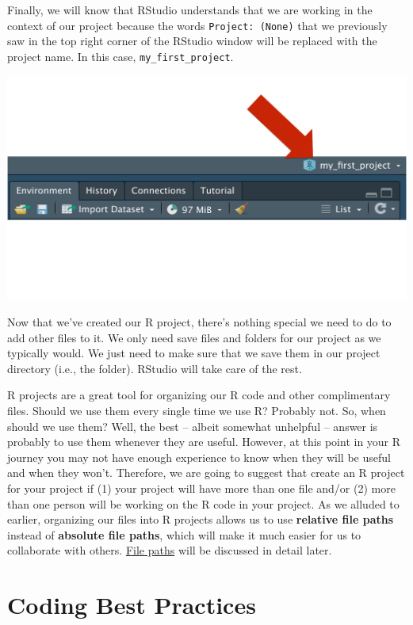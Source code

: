 \documentclass[
  letterpaper,
  DIV=11,
  numbers=noendperiod]{scrreprt}
\begin{document}
Finally, we will know that RStudio understands that we are working in
the context of our project because the words \texttt{Project:\ (None)}
that we previously saw in the top right corner of the RStudio window
will be replaced with the project name. In this case,
\texttt{my\_first\_project}.

\includegraphics{chapters/r_projects/check_rproj.png}

Now that we've created our R project, there's nothing special we need to
do to add other files to it. We only need save files and folders for our
project as we typically would. We just need to make sure that we save
them in our project directory (i.e., the folder). RStudio will take care
of the rest.

R projects are a great tool for organizing our R code and other
complimentary files. Should we use them every single time we use R?
Probably not. So, when should we use them? Well, the best -- albeit
somewhat unhelpful -- answer is probably to use them whenever they are
useful. However, at this point in your R journey you may not have enough
experience to know when they will be useful and when they won't.
Therefore, we are going to suggest that create an R project for your
project if (1) your project will have more than one file and/or (2) more
than one person will be working on the R code in your project. As we
alluded to earlier, organizing our files into R projects allows us to
use \textbf{relative file paths} instead of \textbf{absolute file
paths}, which will make it much easier for us to collaborate with
others. \hyperref[file-paths]{File paths} will be discussed in detail
later.

\chapter{Coding Best Practices}\label{coding-best-practices}
\end{document}
